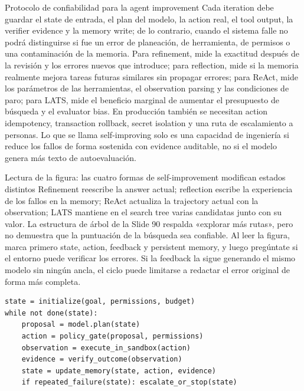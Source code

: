 \begin{warningbox}{Protocolo de confiabilidad para la agent improvement}
Cada iteration debe guardar el state de entrada, el plan del modelo, la action real, el tool output, la verifier evidence y la memory write; de lo contrario, cuando el sistema falle no podrá distinguirse si fue un error de planeación, de herramienta, de permisos o una contaminación de la memoria. Para refinement, mide la exactitud después de la revisión y los errores nuevos que introduce; para reflection, mide si la memoria realmente mejora tareas futuras similares sin propagar errores; para ReAct, mide los parámetros de las herramientas, el observation parsing y las condiciones de paro; para LATS, mide el beneficio marginal de aumentar el presupuesto de búsqueda y el evaluator bias. En producción también se necesitan action idempotency, transaction rollback, secret isolation y una ruta de escalamiento a personas. Lo que se llama self-improving solo es una capacidad de ingeniería si reduce los fallos de forma sostenida con evidence auditable, no si el modelo genera más texto de autoevaluación.
\end{warningbox}

\begin{knowledgebox}{Lectura de la figura: las cuatro formas de self-improvement modifican estados distintos}
Refinement reescribe la answer actual; reflection escribe la experiencia de los fallos en la memory; ReAct actualiza la trajectory actual con la observation; LATS mantiene en el search tree varias candidatas junto con su valor. La estructura de árbol de la Slide 90 respalda «explorar más rutas», pero no demuestra que la puntuación de la búsqueda sea confiable. Al leer la figura, marca primero state, action, feedback y persistent memory, y luego pregúntate si el entorno puede verificar los errores. Si la feedback la sigue generando el mismo modelo sin ningún ancla, el ciclo puede limitarse a redactar el error original de forma más completa.
\end{knowledgebox}


\begin{lstlisting}[caption={Agent loop con verificación y límites de permisos}]
state = initialize(goal, permissions, budget)
while not done(state):
    proposal = model.plan(state)
    action = policy_gate(proposal, permissions)
    observation = execute_in_sandbox(action)
    evidence = verify_outcome(observation)
    state = update_memory(state, action, evidence)
    if repeated_failure(state): escalate_or_stop(state)
\end{lstlisting}

